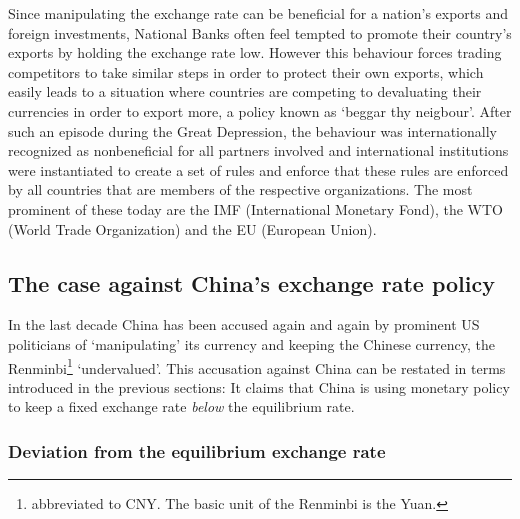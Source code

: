 Since manipulating the exchange rate can be beneficial for a nation's 
exports and foreign investments, National Banks often feel tempted to 
promote their country's exports by holding the exchange rate low.  
However this behaviour forces trading competitors to take similar steps 
in order to protect their own exports, which easily leads to a situation 
where countries are competing to devaluating their currencies in order 
to export more, a policy known as `beggar thy neigbour'. After such an 
episode during the Great Depression, the behaviour was internationally 
recognized as nonbeneficial for all partners involved and international 
institutions were instantiated to create a set of rules and enforce that 
these rules are enforced by all countries that are members of the 
respective organizations.  The most prominent of these today are the IMF 
(International Monetary Fond), the WTO (World Trade Organization) and 
the EU (European Union).



\subsection{The case against China's exchange rate policy}

In the last decade China has been accused again and again by prominent 
US politicians of `manipulating' its currency and keeping the Chinese 
currency, the Renminbi\footnote{abbreviated to CNY.  The basic unit of 
the Renminbi is the Yuan.} `undervalued'. This accusation against China 
can be restated in terms introduced in the previous sections: It claims 
that China is using monetary policy to keep a fixed exchange rate 
\emph{below} the equilibrium rate. 

\subsubsection{Deviation from the equilibrium exchange rate}



